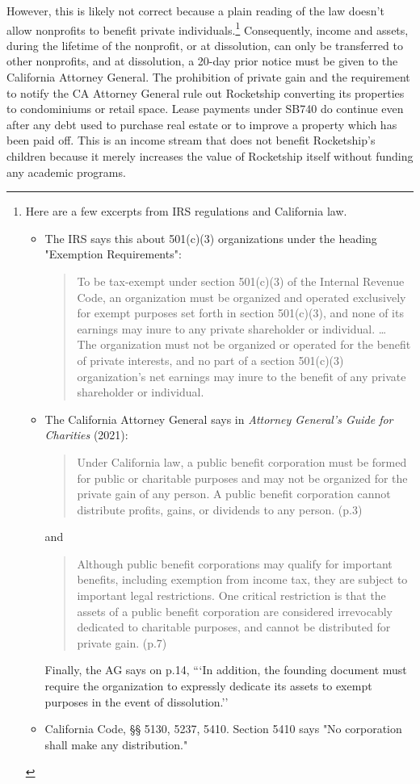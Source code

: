 However, this is likely not correct because a plain reading of the law doesn't allow nonprofits to benefit private individuals.\footnote{Here are a few excerpts from IRS regulations and California law.
  
  \begin{itemize}[topsep=0.125\baselineskip,itemsep=0.25\baselineskip]
    \item The IRS says this about 501(c)(3) organizations under the heading "Exemption Requirements":
    \begin{quote}\noindent
      To be tax-exempt under section 501(c)(3) of the Internal Revenue Code, an organization must be organized and operated exclusively for exempt purposes set forth in section 501(c)(3), and none of its earnings may inure to any private shareholder or individual.
      \ldots\\
      The organization must not be organized or operated for the benefit of private interests, and no part of a section 501(c)(3) organization's net earnings may inure to the benefit of any private shareholder or individual.
    \end{quote}
    
    \item The California Attorney General says in \textit{Attorney General's Guide for Charities} (2021):
    \begin{quote}
      Under California law, a public beneﬁt corporation must be formed for public or charitable purposes and may not be organized for the private gain of any person. A public beneﬁt corporation cannot distribute proﬁts, gains, or dividends to any person. (p.3)
    \end{quote}
    and
    \begin{quote}
      Although public beneﬁt corporations may qualify for important beneﬁts, including exemption from income tax, they are subject to important legal restrictions. One critical restriction is that the assets of a public beneﬁt corporation are considered irrevocably dedicated to charitable purposes, and cannot be distributed for private gain. (p.7)
    \end{quote}
    Finally, the AG says on p.14, ```In addition, the founding document must require the organization to expressly dedicate its assets to exempt purposes in the event of dissolution.''
    \item California Code, §§ 5130, 5237, 5410. Section 5410 says "No corporation shall make any distribution."
  \end{itemize}}
Consequently, income and assets, during the lifetime of the nonprofit, or at dissolution, can only be transferred to other nonprofits, and at dissolution, a 20-day prior notice must be given to the California Attorney General. The prohibition of private gain and the requirement to notify the CA Attorney General rule out Rocketship converting its properties to condominiums or retail space. Lease payments under SB740 do continue even after any debt used to purchase real estate or to improve a property which has been paid off. This is an income stream that does not benefit Rocketship's children because it merely increases the value of Rocketship itself without funding any academic programs.

